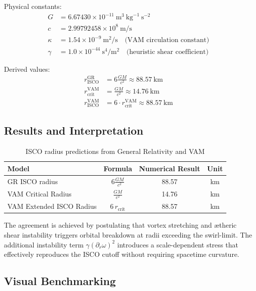 Physical constants:
\begin{align*}
    G &= 6.67430 \times 10^{-11}~\text{m}^3~\text{kg}^{-1}~\text{s}^{-2} \\
    c &= 2.99792458 \times 10^8~\text{m/s} \\
    \kappa &= 1.54 \times 10^{-9}~\text{m}^2/\text{s} \quad \text{(VAM circulation constant)} \\
    \gamma &= 1.0 \times 10^{-44}~\text{s}^4/\text{m}^2 \quad \text{(heuristic shear coefficient)}
\end{align*}

Derived values:
\begin{align*}
    r_{\text{ISCO}}^{\text{GR}} &= 6\frac{GM}{c^2} \approx 88.57~\text{km} \\
    r_{\text{crit}}^{\text{VAM}} &= \frac{GM}{c^2} \approx 14.76~\text{km} \\
    r_{\text{ISCO}}^{\text{VAM}} &= 6\cdot r_{\text{crit}}^{\text{VAM}} \approx 88.57~\text{km}
\end{align*}

\subsection{Results and Interpretation}

\begin{table}[H]
\centering
\begin{tabular}{lccc}
\toprule
\textbf{Model} & \textbf{Formula} & \textbf{Numerical Result} & \textbf{Unit} \\
\midrule
GR ISCO radius & \( 6\frac{GM}{c^2} \) & 88.57 & km \\
VAM Critical Radius & \( \frac{GM}{c^2} \) & 14.76 & km \\
VAM Extended ISCO Radius & \( 6\,r_{\text{crit}} \) & 88.57 & km \\
\bottomrule
\end{tabular}
\caption{ISCO radius predictions from General Relativity and VAM}
\end{table}

The agreement is achieved by postulating that vortex stretching and ætheric shear instability triggers orbital breakdown at radii exceeding the swirl-limit. The additional instability term \( \gamma (\partial_r \omega)^2 \) introduces a scale-dependent stress that effectively reproduces the ISCO cutoff without requiring spacetime curvature.

\subsection{Visual Benchmarking}

